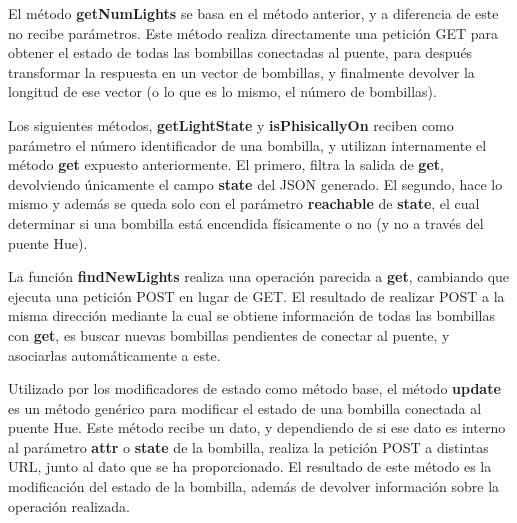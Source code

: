         \vspace{0.3cm}

        El método \textbf{getNumLights} se basa en el método anterior, y a diferencia de este no recibe parámetros. Este método realiza directamente una petición GET para obtener el estado de todas las bombillas conectadas al puente, para después transformar la respuesta en un vector de bombillas, y finalmente devolver la longitud de ese vector (o lo que es lo mismo, el número de bombillas). \\

        \vspace{0.3cm}

        Los siguientes métodos, \textbf{getLightState} y \textbf{isPhisicallyOn} reciben como parámetro el número identificador de una bombilla, y utilizan internamente el método \textbf{get} expuesto anteriormente. El primero, filtra la salida de \textbf{get}, devolviendo únicamente el campo \textbf{state} del JSON generado. El segundo, hace lo mismo y además se queda solo con el parámetro \textbf{reachable} de \textbf{state}, el cual determinar si una bombilla está encendida físicamente o no (y no a través del puente Hue). \\

        \vspace{0.3cm}

        La función \textbf{findNewLights} realiza una operación parecida a \textbf{get}, cambiando que ejecuta una petición POST en lugar de GET. El resultado de realizar POST a la misma dirección mediante la cual se obtiene información de todas las bombillas con \textbf{get}, es buscar nuevas bombillas pendientes de conectar al puente, y asociarlas automáticamente a este. \\

        \vspace{0.3cm}

        Utilizado por los modificadores de estado como método base, el método \textbf{update} es un método genérico para modificar el estado de una bombilla conectada al puente Hue. Este método recibe un dato, y dependiendo de si ese dato es interno al parámetro \textbf{attr} o \textbf{state} de la bombilla, realiza la petición POST a distintas URL, junto al dato que se ha proporcionado. El resultado de este método es la modificación del estado de la bombilla, además de devolver información sobre la operación realizada. \\

